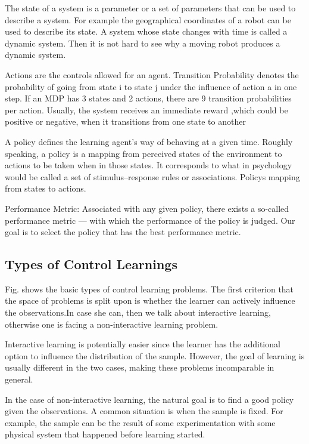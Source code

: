 The state of a system is a parameter or a set of parameters that can be used to describe a system. For example the geographical coordinates of a robot can be used to
describe its state. A system whose state changes with time is called a dynamic system. Then it is not hard to see why a moving robot produces a dynamic system.

Actions are the controls allowed for an agent. Transition Probability denotes the probability of going from state i to state j under the influence of action a in one step. If an MDP has 3 states and 2 actions, there are 9 transition probabilities per action. Usually, the system receives an immediate reward ,which could be positive or negative, when it transitions from one state to another

A policy defines the learning agent’s way of behaving at a given time. Roughly speaking, a policy is a mapping from perceived states of the environment
to actions to be taken when in those states. It corresponds to what in
psychology would be called a set of stimulus–response rules or associations.  Policys mapping from states to actions.

Performance Metric: Associated with any given policy, there exists a so-called performance
metric — with which the performance of the policy is judged. Our goal is to select the policy
that has the best performance metric. 

\subsection{Types of Control Learnings}


Fig. shows the basic types of control learning problems. The first criterion that the space of problems is split upon is whether the learner can actively influence the observations.In case she can, then we talk about interactive learning, otherwise one is facing a non-interactive learning problem.

Interactive learning is potentially easier since the learner has the additional option to influence the distribution of the sample. However, the goal of
learning is usually different in the two cases, making these problems incomparable in general.

In the case of non-interactive learning, the natural goal is to find a good policy given the observations.
A common situation is when the sample is fixed. For example, the sample can be the result of some experimentation with some physical system that happened before learning started. 

